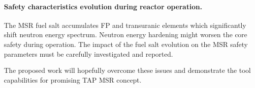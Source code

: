 \paragraph{Safety characteristics evolution during reactor operation.} The 
\gls{MSR} fuel salt  accumulates \gls{FP} and transuranic elements which 
significantly shift neutron energy spectrum. Neutron energy hardening might 
worsen the core safety during operation. The impact of the fuel salt evolution 
on the \gls{MSR} safety parameters must be carefully investigated and reported.

The proposed work will hopefully overcome these issues and demonstrate the 
tool capabilities for promising \gls{TAP} \gls{MSR} concept.
